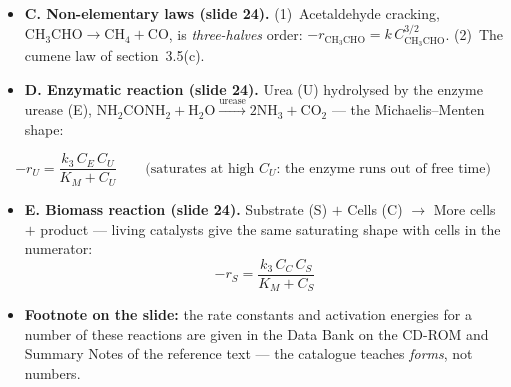 \documentclass[10pt,a4paper]{article}
\newenvironment{formulabox}{%
  \par\addvspace{4pt}\noindent\begin{lrbox}{\spboxa}%
  \begin{minipage}{\dimexpr\linewidth-12pt\relax}\small\color{inbox}%
}{\end{minipage}\end{lrbox}%
  \fcolorbox{boxframe}{boxbg}{\usebox{\spboxa}}\par\addvspace{6pt}}
\begin{document}
\begin{itemize}
\item \textbf{C. Non-elementary laws (slide 24).} (1)~Acetaldehyde cracking, $\mathrm{CH_3CHO}\to\mathrm{CH_4}+\mathrm{CO}$, is \emph{three-halves} order: $-r_{\mathrm{CH_3CHO}} = k\,C_{\mathrm{CH_3CHO}}^{3/2}$. (2)~The cumene law of section~3.5(c).
\item \textbf{D. Enzymatic reaction (slide 24).} Urea (U) hydrolysed by the enzyme urease (E), $\mathrm{NH_2CONH_2}+\mathrm{H_2O}\xrightarrow{\text{urease}}2\mathrm{NH_3}+\mathrm{CO_2}$ --- the Michaelis--Menten shape:
\end{itemize}
\begin{formulabox}
\[
-r_U = \frac{k_3\,C_E\,C_U}{K_M + C_U}
\qquad\text{(saturates at high $C_U$: the enzyme runs out of free time)}
\]
\end{formulabox}
\begin{itemize}
\item \textbf{E. Biomass reaction (slide 24).} Substrate (S) $+$ Cells (C) $\to$ More cells $+$ product --- living catalysts give the same saturating shape with cells in the numerator:
\[
-r_S = \frac{k_3\,C_C\,C_S}{K_M + C_S}
\]
\item \textbf{Footnote on the slide:} the rate constants and activation energies for a number of these reactions are given in the Data Bank on the CD-ROM and Summary Notes of the reference text --- the catalogue teaches \emph{forms}, not numbers.
\end{itemize}
\end{document}
